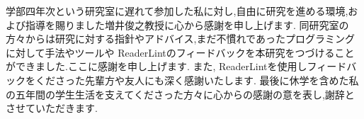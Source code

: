 \begin{acknowledgment}
    学部四年次という研究室に遅れて参加した私に対し,自由に研究を進める環境,および指導を賜りました増井俊之教授に心から感謝を申し上げます.
    同研究室の方々からは研究に対する指針やアドバイス,まだ不慣れであったプログラミングに対して手法やツールや
    ReaderLintのフィードバックを本研究をつづけることができました.ここに感謝を申し上げます.
    また, ReaderLintを使用しフィードバックをくださった先輩方や友人にも深く感謝いたします.
    最後に休学を含めた私の五年間の学生生活を支えてくださった方々に心からの感謝の意を表し,謝辞とさせていただきます.
\end{acknowledgment}


